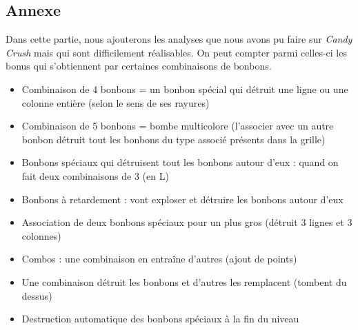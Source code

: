 \subsection{Annexe}
Dans cette partie, nous ajouterons les analyses que nous avons pu faire sur \emph{Candy Crush} mais qui sont difficilement réalisables.
On peut compter parmi celles-ci les bonus qui s'obtiennent par certaines combinaisons de bonbons.
\begin{itemize}

\item
	Combinaison de 4 bonbons = un bonbon spécial qui détruit une ligne ou une colonne entière (selon le sens de ses rayures)

\item
	Combinaison de 5 bonbons = bombe multicolore (l'associer avec un autre bonbon détruit tout les bonbons du type associé présents dans la grille)
\item
	Bonbons spéciaux qui détruisent tout les bonbons autour d'eux : quand on fait deux combinaisons de 3 (en L)
\item
	Bonbons à retardement : vont exploser et détruire les bonbons autour d'eux 
\item
	Association de deux bonbons spéciaux pour un plus gros (détruit 3 lignes et 3 colonnes)      
\item
	Combos : une combinaison en entraîne d'autres (ajout de points)
\item
	Une combinaison détruit les bonbons et d'autres les remplacent (tombent du dessus) 
\item
	Destruction automatique des bonbons spéciaux à la fin du niveau

\end{itemize}
